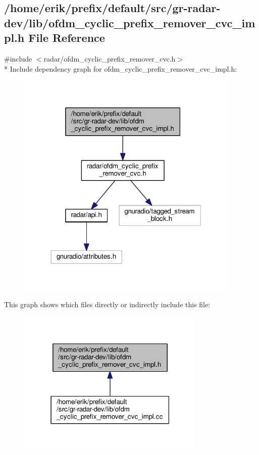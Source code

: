 \subsection{/home/erik/prefix/default/src/gr-\/radar-\/dev/lib/ofdm\+\_\+cyclic\+\_\+prefix\+\_\+remover\+\_\+cvc\+\_\+impl.h File Reference}
\label{ofdm__cyclic__prefix__remover__cvc__impl_8h}
{\ttfamily \#include $<$radar/ofdm\+\_\+cyclic\+\_\+prefix\+\_\+remover\+\_\+cvc.\+h$>$}\\*
Include dependency graph for ofdm\+\_\+cyclic\+\_\+prefix\+\_\+remover\+\_\+cvc\+\_\+impl.\+h\+:
\nopagebreak
\begin{figure}[H]
\begin{center}
\leavevmode
\includegraphics[width=302pt]{d8/d84/ofdm__cyclic__prefix__remover__cvc__impl_8h__incl}
\end{center}
\end{figure}
This graph shows which files directly or indirectly include this file\+:
\nopagebreak
\begin{figure}[H]
\begin{center}
\leavevmode
\includegraphics[width=255pt]{db/d68/ofdm__cyclic__prefix__remover__cvc__impl_8h__dep__incl}
\end{center}
\end{figure}
